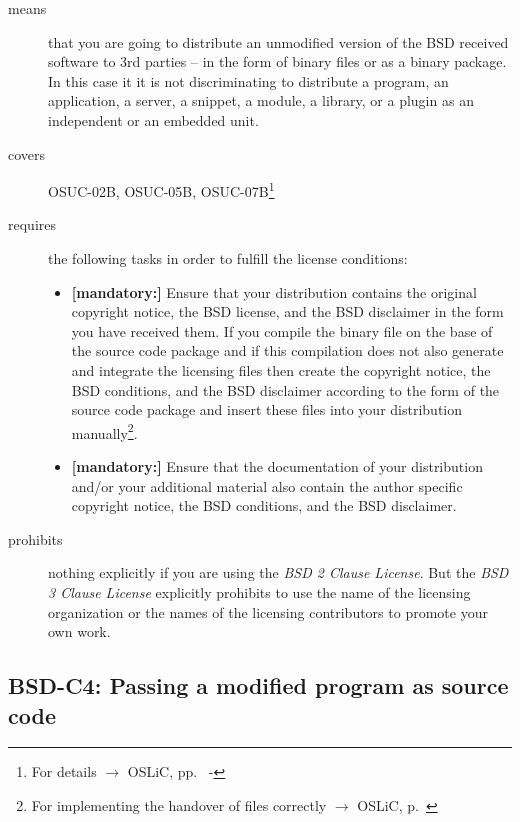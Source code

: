 \begin{description}
\item[means] that you are going to distribute an unmodified version of the BSD
received software to 3rd parties -- in the form of binary files or as a bi\-na\-ry
package. In this case it it is not discriminating to distribute a
program, an application, a server, a snippet, a module, a library, or a plugin
as an independent or an embedded unit.
\item[covers] OSUC-02B, OSUC-05B, OSUC-07B\footnote{For details $\rightarrow$
OSLiC, pp.\ \pageref{OSUC-02B-DEF} - \pageref{OSUC-07B-DEF}}
\item[requires] the following tasks in order to fulfill the license conditions:
\begin{itemize}
  
  \item  \textbf{[mandatory:]} Ensure that your distribution contains the
  original copyright notice, the BSD license, and the BSD disclaimer in the form
  you have received them. If you compile the binary file on the base of the
  source code package and if this compilation does not also generate and
  integrate the licensing files then create the copyright notice, the BSD
  conditions, and the BSD disclaimer according to the form of the source code
  package and insert these files into your distribution manually\footnote{For
  implementing the handover of files correctly $\rightarrow$ OSLiC, p.\ 
  \pageref{DistributingFilesHint}}.
  
  \item  \textbf{[mandatory:]} Ensure that the documentation of your
  distribution and/or your additional material also contain the author specific
  copyright notice, the BSD conditions, and the BSD disclaimer.
\end{itemize}

\item[prohibits] nothing explicitly if you are using the \emph{BSD 2 Clause
License}. But the \emph{BSD 3 Clause License} explicitly prohibits to use the
name of the licensing organization or the names of the licensing contributors to
promote your own work.

\end{description}

\subsection{BSD-C4: Passing a modified program as source code}
\label{OSUC-04S-BSD}

